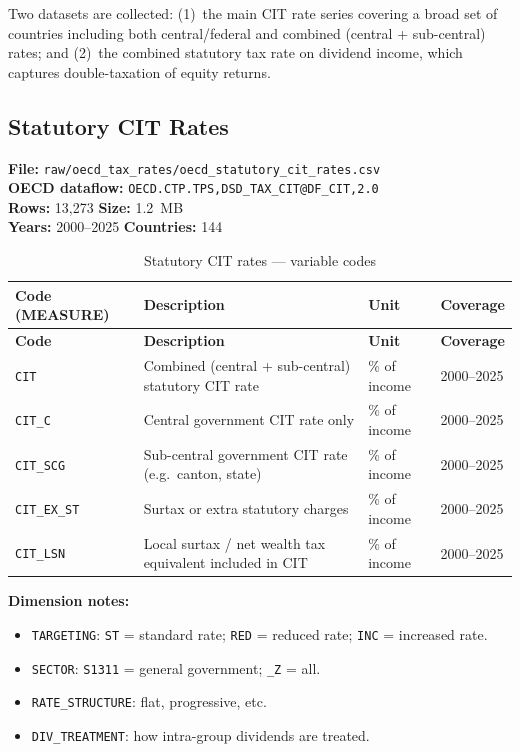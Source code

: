 \documentclass[11pt,a4paper]{article}
\begin{document}
Two datasets are collected: (1)~the main CIT rate series covering a broad set
of countries including both central/federal and combined (central + sub-central)
rates; and (2)~the combined statutory tax rate on dividend income, which
captures double-taxation of equity returns.

\subsection{Statutory CIT Rates}
\label{subsec:cit_rates}

\textbf{File:} \texttt{raw/oecd\_tax\_rates/oecd\_statutory\_cit\_rates.csv}\\
\textbf{OECD dataflow:} \texttt{OECD.CTP.TPS,DSD\_TAX\_CIT@DF\_CIT,2.0}\\
\textbf{Rows:} 13{,}273 \quad \textbf{Size:} 1.2~MB\\
\textbf{Years:} 2000--2025 \quad \textbf{Countries:} 144

\begin{longtable}{L{2.8cm} L{6.0cm} C{1.8cm} C{2.5cm}}
    \caption{Statutory CIT rates --- variable codes}
    \label{tab:cit_rates}\\
    \toprule
    \textbf{Code (MEASURE)} & \textbf{Description} & \textbf{Unit} & \textbf{Coverage} \\
    \midrule
    \endfirsthead
    \toprule
    \textbf{Code} & \textbf{Description} & \textbf{Unit} & \textbf{Coverage} \\
    \midrule
    \endhead
    \bottomrule
    \endlastfoot
    \texttt{CIT}       & Combined (central + sub-central) statutory CIT rate & \% of income & 2000--2025 \\
    \texttt{CIT\_C}    & Central government CIT rate only & \% of income & 2000--2025 \\
    \texttt{CIT\_SCG}  & Sub-central government CIT rate (e.g.\ canton, state) & \% of income & 2000--2025 \\
    \texttt{CIT\_EX\_ST} & Surtax or extra statutory charges & \% of income & 2000--2025 \\
    \texttt{CIT\_LSN}  & Local surtax / net wealth tax equivalent included in CIT & \% of income & 2000--2025 \\
\end{longtable}

\noindent\textbf{Dimension notes:}
\begin{itemize}[noitemsep]
    \item \texttt{TARGETING}: \texttt{ST} = standard rate; \texttt{RED} = reduced rate;
          \texttt{INC} = increased rate.
    \item \texttt{SECTOR}: \texttt{S1311} = general government; \texttt{\_Z} = all.
    \item \texttt{RATE\_STRUCTURE}: flat, progressive, etc.
    \item \texttt{DIV\_TREATMENT}: how intra-group dividends are treated.
\end{itemize}
\end{document}
